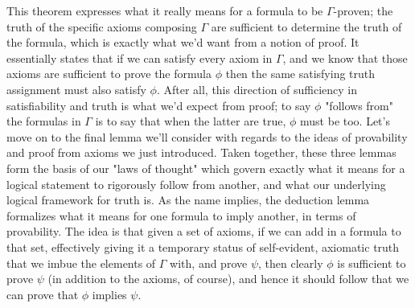 \documentclass{article}
\begin{document}
This theorem expresses what it really means for a formula to be $ \Gamma $-proven; the truth of the specific axioms composing $ \Gamma $ are sufficient to determine the truth of the formula, which is exactly what we'd want from a notion of proof. It essentially states that if we can satisfy every axiom in $ \Gamma $, and we know that those axioms are sufficient to prove the formula $ \phi $ then the same satisfying truth assignment must also satisfy $ \phi $. After all, this direction of sufficiency in satisfiability and truth is what we'd expect from proof; to say $ \phi $ "follows from" the formulas in $ \Gamma $ is to say that when the latter are true, $ \phi $ must be too.
\nn
Let's move on to the final lemma we'll consider with regards to the ideas of provability and proof from axioms we just introduced. Taken together, these three lemmas form the basis of our "laws of thought" which govern exactly what it means for a logical statement to rigorously follow from another, and what our underlying logical framework for truth is.
As the name implies, the deduction lemma formalizes what it means for one formula to imply another, in terms of provability. The idea is that given a set of axioms, if we can add in a formula to that set, effectively giving it a temporary status of self-evident, axiomatic truth that we imbue the elements of $ \Gamma $ with, and prove $ \psi $, then clearly $ \phi $ is sufficient to prove $ \psi $ (in addition to the axioms, of course), and hence it should follow that we can prove that $ \phi $ implies $ \psi $.
\end{document}
